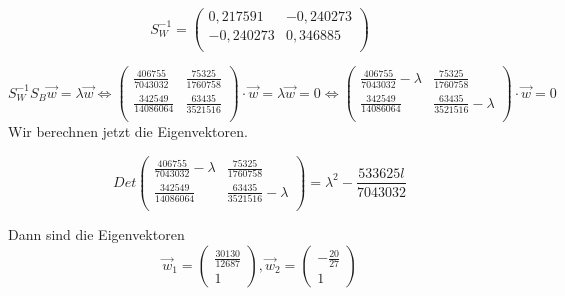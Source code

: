 \documentclass[a4paper,parskip=full-]{article}
\begin{document}
$$
S_W^{-1} = \left(
\begin{array}{cc}
 0,217591 & -0,240273 \\
 -0,240273 & 0,346885 \\
\end{array}
\right)
$$

$$
S_W^{-1} S_B \vec{w} = \lambda \vec{w} \Leftrightarrow
\left(
\begin{array}{cc}
 \frac{406755}{7043032} & \frac{75325}{1760758} \\
 \frac{342549}{14086064} & \frac{63435}{3521516} \\
\end{array}
\right) \cdot \vec{w} = \lambda \vec{w} = 0 \Leftrightarrow
\left(
\begin{array}{cc}
 \frac{406755}{7043032} - \lambda & \frac{75325}{1760758}\\
 \frac{342549}{14086064} & \frac{63435}{3521516} - \lambda \\
\end{array}
\right) \cdot \vec{w} = 0
$$
Wir berechnen jetzt die Eigenvektoren.

$$
Det\left(
\begin{array}{cc}
 \frac{406755}{7043032} - \lambda & \frac{75325}{1760758}\\
 \frac{342549}{14086064} & \frac{63435}{3521516} - \lambda \\
\end{array}
\right) = \lambda^2-\frac{533625 l}{7043032}
$$

Dann sind die Eigenvektoren
$$
\vec{w}_1 = \begin{pmatrix}
\frac{30130}{12687} \\ 1
\end{pmatrix} , \vec{w}_2 = \begin{pmatrix}
-\frac{20}{27} \\ 1
\end{pmatrix}
$$
\end{document}
